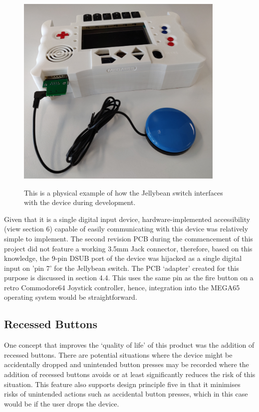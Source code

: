 \begin{figure} [h]
    \centering
    \includegraphics[width=10cm,height=10cm,keepaspectratio]{Figures/jellybean.jpg}
    \caption{This is a physical example of how the Jellybean switch interfaces with the device during development.}
    \label{fig:Jellybean}
\end{figure}

Given that it is a single digital input device, hardware-implemented accessibility (view section 6) capable of easily communicating with this device was relatively simple to implement. 
The second revision PCB during the commencement of this project did not feature a working 3.5mm Jack connector, therefore, based on this knowledge, the 9-pin DSUB port of the device was hijacked as a single digital input on 'pin 7' for the Jellybean switch. 
The PCB ‘adapter’ created for this purpose is discussed in section 4.4.
This uses the same pin as the fire button on a retro Commodore64 Joystick controller, hence, integration into the MEGA65 operating system would be straightforward.

\subsection{Recessed Buttons}

One concept that improves the ‘quality of life’ of this product was the addition of recessed buttons.
There are potential situations where the device might be accidentally dropped and unintended button presses may be recorded where the addition of recessed buttons avoids or at least significantly reduces the risk of this situation.
This feature also supports design principle five in that it minimises risks of unintended actions such as accidental button presses, which in this case would be if the user drops the device.

